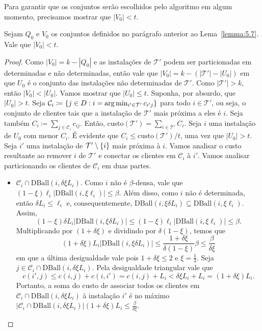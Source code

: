     Para garantir que os conjuntos serão escolhidos pelo algoritmo em algum momento, precisamos mostrar que $|V_0| < t$.
    \begin{lemma}
        Sejam $Q_0$ e $V_0$ os conjuntos definidos no parágrafo anterior ao Lema~\ref{lemma:5.7}. Vale que ${|V_0| < t}$.
    \end{lemma}
    \begin{proof}
    Como $|V_0| = k - |Q_0|$ e as instalações de $\mathcal{T}'$ podem ser particionadas em determinadas e não determinadas, então vale que ${|V_0| = k - (|\mathcal{T}'| - |U_0|)}$ em que $U_0$ é o conjunto das instalações não determinadas de $\mathcal{T}'$. Como $|\mathcal{T}'| > k$, então $|V_0| < |U_0|$. Vamos mostrar que $|U_0| \leq t$. Suponha, por absurdo, que $|U_0| > t$. Seja ${\mathcal{C}_i \coloneqq \{j \in D : i = \arg\min_{i' \in \mathcal{T}'} c_{i'j}\}}$ para todo $i \in \mathcal{T}'$, ou seja, o conjunto de clientes tais que a instalação de $\mathcal{T}'$ mais próxima a eles é $i$. Seja também $C_i \coloneqq \sum_{j \in \mathcal{C}_i} c_{ij}$. Então, custo$(\mathcal{T'}) =\sum_{i \in \mathcal{T}'} C_i$. Seja $i$ uma instalação de $U_0$ com menor $C_i$. É evidente que ${C_i \leq \text{custo}(\mathcal{T}')/t}$, uma vez que $|U_0| > t$. Seja $i'$ uma instalação de $\mathcal{T'}\setminus\{i\}$ mais próxima à $i$. Vamos analisar o custo resultante ao remover $i$ de $\mathcal{T}'$ e conectar os clientes em $\mathcal{C}_i$ à $i'$. Vamos analisar particionando os clientes de $\mathcal{C}_i$ em duas partes.
    \begin{itemize}
        \item $\mathcal{C}_i \cap \text{DBall}(i,\delta\xi L_i)$. Como $i$ não é $\beta$-densa, vale que ${(1-\xi) \ell_i |\text{DBall}(i,\xi\ell_i)| \leq \beta}$. Além disso, como $i$ não é determinada, então $\delta L_i \leq \ell_i$ e, consequentemente, DBall$(i, \xi\delta L_i) \subseteq \text{DBall}(i,\xi\ell_i)$. Assim,
        \[(1 - \xi) \delta L_i |\text{DBall}(i,\xi\delta L_i)| \leq (1-\xi)\ell_i |\text{DBall}(i,\xi\ell_i)| \leq \beta.\]
        Multiplicando por $(1 + \delta\xi)$ e dividindo por $\delta(1 - \xi)$, temos que
        \[(1 + \delta\xi) L_i |\text{DBall}(i,\xi\delta L_i)| \leq \frac{1 + \delta\xi}{\delta(1 - \xi)} \beta \leq \frac{\beta}{\delta\xi}\]
        em que a última desigualdade vale pois $1 + \delta\xi \leq 2$ e $\xi = \frac{1}{3}$. Seja ${j \in \mathcal{C}_i \cap \text{DBall}(i, \delta \xi L_i)}$. Pela desigualdade triangular vale que \[c(i',j) \leq c(i,j) + c(i,i') = c(i,j) + L_i < \delta\xi L_i + L_i = (1 + \delta\xi) L_i.\] Portanto, a soma do custo de associar todos os clientes em $\mathcal{C}_i \cap \text{DBall}(i, \delta \xi L_i)$ à instalação $i'$ é no máximo $ |\mathcal{C}_i \cap \text{DBall}(i, \delta \xi L_i)| ( 1 + \delta\xi) L_i \leq \frac{\beta}{\delta\xi}$.

\end{itemize}
\end{proof}
